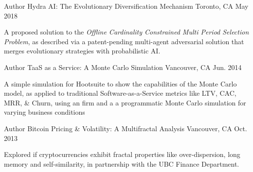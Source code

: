 

\begin{cventries}

	\cventry
	{Author} %
	{Hydra AI: The Evolutionary Diversification Mechanism}  %
	{Toronto, CA} %
	{May 2018} %
	{A proposed solution to the \textit{Offline Cardinality Constrained Multi Period Selection Problem}, as described via a patent-pending multi-agent adversarial solution that merges evolutionary strategies with probabilistic AI.
		\begin{cvitems} %
		\end{cvitems}
	}

	\cventry
	{Author} %
	{TaaS as a Service: A Monte Carlo Simulation}  %
	{Vancouver, CA} %
	{Jun. 2014} %
	{A simple simulation for Hootsuite to show the capabilities of the Monte Carlo model, as applied  to traditional Software-as-a-Service metrics like LTV, CAC, MRR, \& Churn, using an firm and a a programmatic Monte Carlo simulation for varying business conditions
		\begin{cvitems} %
		\end{cvitems}
	}

	\cventry
	{Author} %
	{Bitcoin Pricing \&  Volatility: A Multifractal Analysis}  %
	{Vancouver, CA} %
	{Oct. 2013} %
	{Explored if cryptocurrencies exhibit fractal properties like over-dispersion, long memory and self-similarity, in partnership with the UBC Finance Department.
		\begin{cvitems} %
		\end{cvitems}
	}

\end{cventries}
